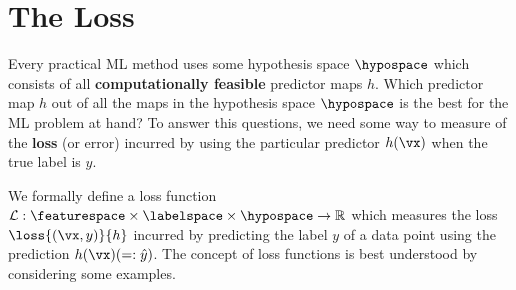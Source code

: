 \documentclass[12pt]{report}
\begin{document}

\section{The Loss}
\label{sec_lossfct}

Every practical ML method uses some hypothesis space $\hypospace$ 
which consists of all {\bf computationally feasible} predictor maps $h$. 
Which predictor map $h$ out of all the maps in the hypothesis space 
$\hypospace$ is the best for the ML problem at hand? To answer this 
questions, we need some way to measure of the {\bf loss} (or error) 
incurred by using the particular predictor $h(\vx)$ when the true label 
is $y$. 

We formally define a loss function $\mathcal{L}: \featurespace \times \labelspace \times \hypospace \rightarrow \mathbb{R}$ 
which measures the loss $\loss{(\vx,y)}{h}$ incurred by predicting the 
label $y$ of a data point using the prediction $h(\vx)(=: \hat{y})$. 
The concept of loss functions is best understood by considering 
some examples. 
\end{document}
